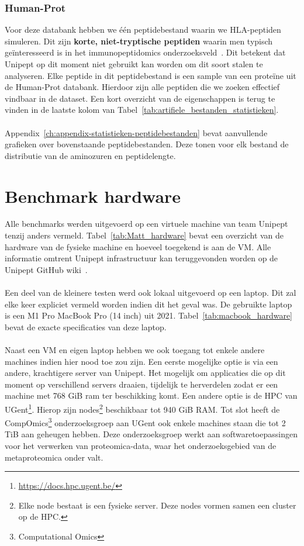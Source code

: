 \subsubsection{Human-Prot}
Voor deze databank hebben we één peptidebestand waarin we HLA-peptiden simuleren.
Dit zijn \textbf{korte, niet-tryptische peptiden} waarin men typisch geïnteresseerd is in het immunopeptidomics onderzoeksveld~\cite{immunopeptidomics}.
Dit betekent dat Unipept op dit moment niet gebruikt kan worden om dit soort stalen te analyseren.
Elke peptide in dit peptidebestand is een sample van een proteïne uit de Human-Prot databank.
Hierdoor zijn alle peptiden die we zoeken effectief vindbaar in de dataset.
Een kort overzicht van de eigenschappen is terug te vinden in de laatste kolom van Tabel~\ref{tab:artifiele_bestanden_statistieken}.
\\ \\
Appendix~\ref{ch:appendix-statistieken-peptidebestanden} bevat aanvullende grafieken over bovenstaande peptidebestanden.
Deze tonen voor elk bestand de distributie van de aminozuren en peptidelengte.


\section{Benchmark hardware}\label{sec:benchmark-hardware}
Alle benchmarks werden uitgevoerd op een virtuele machine van team Unipept tenzij anders vermeld.
Tabel~\ref{tab:Matt_hardware} bevat een overzicht van de hardware van de fysieke machine en hoeveel toegekend is aan de VM\@.
Alle informatie omtrent Unipept infrastructuur kan teruggevonden worden op de Unipept GitHub wiki~\cite{unipept_infrastructure}.
\\ \\
Een deel van de kleinere testen werd ook lokaal uitgevoerd op een laptop.
Dit zal elke keer expliciet vermeld worden indien dit het geval was.
De gebruikte laptop is een M1 Pro MacBook Pro (14 inch) uit 2021.
Tabel~\ref{tab:macbook_hardware} bevat de exacte specificaties van deze laptop.
\\ \\
Naast een VM en eigen laptop hebben we ook toegang tot enkele andere machines indien hier nood toe zou zijn.
Een eerste mogelijke optie is via een andere, krachtigere server van Unipept.
Het mogelijk om applicaties die op dit moment op verschillend servers draaien, tijdelijk te herverdelen zodat er een machine met 768 GiB ram ter beschikking komt.
Een andere optie is de HPC van UGent\footnote{\url{https://docs.hpc.ugent.be/}}.
Hierop zijn nodes\footnote{Elke node bestaat is een fysieke server. Deze nodes vormen samen een cluster op de HPC.} beschikbaar tot 940 GiB RAM\@.
Tot slot heeft de CompOmics\footnote{Computational Omics} onderzoeksgroep aan UGent ook enkele machines staan die tot 2 TiB aan geheugen hebben.
Deze onderzoeksgroep werkt aan softwaretoepassingen voor het verwerken van proteomica-data, waar het onderzoeksgebied van de metaproteomica onder valt.

